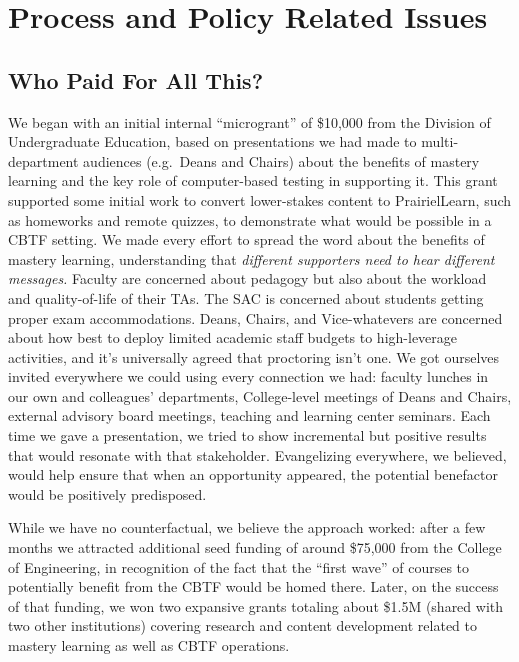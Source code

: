
\section{Process and Policy Related Issues}


\subsection{Who Paid For All This?}


We began with an initial internal ``microgrant'' of \$10,000 from the
Division of Undergraduate Education, based on presentations we had
made to multi-department audiences (e.g.\ Deans and Chairs) about the
benefits of mastery learning and the key role of computer-based
testing in supporting it.  This grant supported some initial work
to convert lower-stakes content to PrairielLearn, such as homeworks
and remote quizzes,
to demonstrate what would be
possible in a CBTF setting.
We made every effort to spread the word about the benefits of mastery
learning, understanding that \emph{different supporters need to hear
different messages.\/}  Faculty are concerned about pedagogy but also
about the workload and quality-of-life of their TAs.  The SAC is
concerned about students getting proper exam accommodations.  Deans,
Chairs, and Vice-whatevers are concerned about how best to deploy
limited academic staff budgets to high-leverage activities, and it's
universally agreed that proctoring isn't one.
We got ourselves invited everywhere we could using every connection we
had: faculty lunches in our
own and colleagues' departments, College-level meetings of Deans and Chairs,
external advisory board meetings, teaching and learning center seminars.
Each time we gave a presentation, we tried to show incremental but
positive results that would resonate with that stakeholder.
Evangelizing everywhere, we believed, would help ensure that when
an opportunity appeared, the potential benefactor would be positively
predisposed.

While we have no counterfactual, we believe the approach worked:
after a few months we attracted additional
seed funding of around \$75,000 from the College of Engineering, in
recognition of the fact that the ``first wave'' of courses to
potentially benefit from the CBTF would be homed there.
Later, on the success of that funding, we won two expansive grants
totaling about \$1.5M (shared with two 
other institutions) covering research and content development related
to mastery learning as well as CBTF operations.

